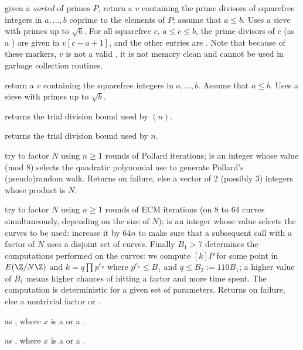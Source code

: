 given a \emph{sorted}  of primes $P$, return a  $v$
containing the prime divisors of squarefree integers in $a,\dots,b$ coprime to
the elements of $P$; assume that $a \leq b$. Uses a sieve with primes up to
$\sqrt{b}$. For all squarefree $c$, $a\leq c\leq b$, the prime divisors of $c$
(as a ) are given in $v[c-a+1]$, and the other entries are
. Note that because of these  markers, $v$ is not a valid
, it is not memory clean and cannot be used in garbage collection
routines.

 return a  $v$
containing the squarefree integers in $a,\dots,b$. Assume that
$a\leq b$. Uses a sieve with primes up to $\sqrt{b}$.

 returns the trial division bound used by
$(n)$.

 returns the trial division bound used
by $n$.

 try to factor
 $N$ using $n\geq 1$ rounds of Pollard iterations;  is an
integer whose value (mod $8$) selects the quadratic polynomial use to
generate Pollard's (pseudo)random walk. Returns  on failure, else a
vector of 2 (possibly 3) integers whose product is $N$.

 try to
factor  $N$ using $n\geq 1$ rounds of ECM iterations (on $8$ to $64$
curves simultaneously, depending on the size of $N$);  is an
integer whose value selects the curves to be used: increase it by $64n$ to
make sure that a subsequent call with a factor of $N$ uses a disjoint set of
curves.
Finally $B_1 > 7$ determines the computations performed on the
curves: we compute $[k]P$ for some point in $E(\Z/N\Z)$ and $k = q \prod
p^{e_p}$ where $p^{e_p} \leq B_1$ and $q \leq B_2 := 110 B_1$; a higher value
of $B_1$ means higher chances of hitting a factor and more time spent.
The computation is deterministic for a given set of parameters. Returns
 on failure, else a nontrivial factor or .

 as , where $x$ is a  or
a .

 as , where
$x$ is a  or a .

